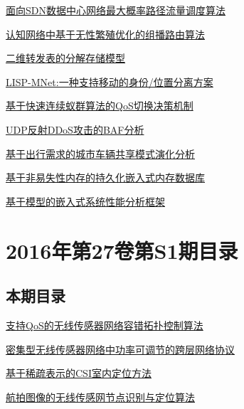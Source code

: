 \documentclass[a4paper]{article}
\begin{document}
\href{http://www.jos.org.cn/ch/reader/create_pdf.aspx?file_no=16039&year_id=2016&quarter_id=S2&falg=1}{面向SDN数据中心网络最大概率路径流量调度算法}

\href{http://www.jos.org.cn/ch/reader/create_pdf.aspx?file_no=16040&year_id=2016&quarter_id=S2&falg=1}{认知网络中基于无性繁殖优化的组播路由算法}

\href{http://www.jos.org.cn/ch/reader/create_pdf.aspx?file_no=16041&year_id=2016&quarter_id=S2&falg=1}{二维转发表的分解存储模型}

\href{http://www.jos.org.cn/ch/reader/create_pdf.aspx?file_no=16042&year_id=2016&quarter_id=S2&falg=1}{LISP-MNet:一种支持移动的身份/位置分离方案}

\href{http://www.jos.org.cn/ch/reader/create_pdf.aspx?file_no=16043&year_id=2016&quarter_id=S2&falg=1}{基于快速连续蚁群算法的QoS切换决策机制}

\href{http://www.jos.org.cn/ch/reader/create_pdf.aspx?file_no=16044&year_id=2016&quarter_id=S2&falg=1}{UDP反射DDoS攻击的BAF分析}

\href{http://www.jos.org.cn/ch/reader/create_pdf.aspx?file_no=16045&year_id=2016&quarter_id=S2&falg=1}{基于出行需求的城市车辆共享模式演化分析}

\href{http://www.jos.org.cn/ch/reader/create_pdf.aspx?file_no=16046&year_id=2016&quarter_id=S2&falg=1}{基于非易失性内存的持久化嵌入式内存数据库}

\href{http://www.jos.org.cn/ch/reader/create_pdf.aspx?file_no=16047&year_id=2016&quarter_id=S2&falg=1}{基于模型的嵌入式系统性能分析框架}


\section{\textbf{2016年第27卷第S1期目录}}
\subsection{本期目录}
\href{http://www.jos.org.cn/ch/reader/create_pdf.aspx?file_no=16001&year_id=2016&quarter_id=S1&falg=1}{支持QoS的无线传感器网络容错拓扑控制算法}

\href{http://www.jos.org.cn/ch/reader/create_pdf.aspx?file_no=16002&year_id=2016&quarter_id=S1&falg=1}{密集型无线传感器网络中功率可调节的跨层网络协议}

\href{http://www.jos.org.cn/ch/reader/create_pdf.aspx?file_no=16003&year_id=2016&quarter_id=S1&falg=1}{基于稀疏表示的CSI室内定位方法}

\href{http://www.jos.org.cn/ch/reader/create_pdf.aspx?file_no=16004&year_id=2016&quarter_id=S1&falg=1}{航拍图像的无线传感网节点识别与定位算法}
\end{document}
